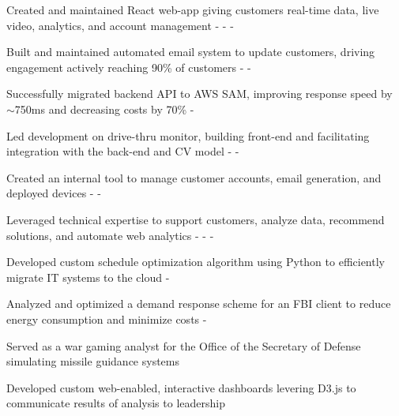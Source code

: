 \documentclass[]{plushcv}
\begin{document}
\begin{minipage}[t]{0.7\textwidth}
\begin{tightemize}
\sectionsep
\item Created and maintained React web-app giving customers real-time data, 
live video, analytics, and account management \react - \python - \gcp - \sql \\
\item Built and maintained automated email system to update customers, 
driving engagement actively reaching 90\% of customers \python - \sql - \gcp  \\
\item Successfully migrated backend API to AWS SAM, improving response speed by
 $\sim$750ms and decreasing costs by 70\% \aws - \gcp \\
\item Led development on drive-thru monitor, building front-end and facilitating
 integration with the back-end and CV model \react - \python - \docker \\
\item Created an internal tool to manage customer accounts, email generation,
 and deployed devices \react - \python - \gcp \\
\item Leveraged technical expertise to support customers, analyze data, 
recommend solutions, and automate web analytics \react - \dthree - \sql - \python \\
\end{tightemize}
\sectionsep

\begin{tightemize}
\sectionsep
\item Developed custom schedule optimization algorithm using Python to 
efficiently migrate IT systems to the cloud \python - \dthree\\
\item Analyzed and optimized a demand response scheme for an FBI client to
 reduce energy consumption and minimize costs \python - \dthree\\
\item Served as a war gaming analyst for the Office of the Secretary of Defense 
simulating missile guidance systems 
\item Developed custom web-enabled, interactive dashboards levering D3.js to 
communicate results of analysis to leadership \dthree\\
\end{tightemize}
\sectionsep


\end{minipage}
\end{document}
